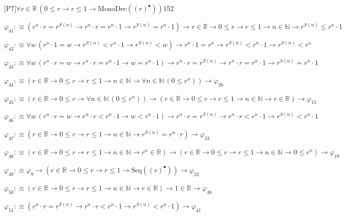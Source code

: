 \begin{fullproof}{[P7]}{$\forall r \in \mathbb{R}\,(0 \leq r \to r \leq 1 \to \mathrm{MonoDec}({(r)^{\bullet}}))$}{152}
\begin{abbrevlist}
\item $\varphi_{41} :\equiv ({{r}^{n}} \cdot r = {{r}^{S(n)}} \to {{r}^{n}} \cdot r = {{r}^{n}} \cdot 1 \to {{r}^{S(n)}} = {{r}^{n}} \cdot 1) \to r \in \mathbb{R} \to 0 \leq r \to r \leq 1 \to n \in \mathbb{N} \to {{r}^{S(n)}} \leq {{r}^{n}} \cdot 1$
\item $\varphi_{42} :\equiv \forall w\,({{r}^{n}} \cdot 1 = w \to {{r}^{S(n)}} < {{r}^{n}} \cdot 1 \to {{r}^{S(n)}} < w) \to {{r}^{n}} \cdot 1 = {{r}^{n}} \to {{r}^{S(n)}} < {{r}^{n}} \cdot 1 \to {{r}^{S(n)}} < {{r}^{n}}$
\item $\varphi_{43} :\equiv \forall w\,({{r}^{n}} \cdot r = w \to {{r}^{n}} \cdot r = {{r}^{n}} \cdot 1 \to w = {{r}^{n}} \cdot 1) \to {{r}^{n}} \cdot r = {{r}^{S(n)}} \to {{r}^{n}} \cdot r = {{r}^{n}} \cdot 1 \to {{r}^{S(n)}} = {{r}^{n}} \cdot 1$
\item $\varphi_{44} :\equiv (r \in \mathbb{R} \to 0 \leq r \to r \leq 1 \to n \in \mathbb{N} \to \forall n \in \mathbb{N}\,(0 \leq {{r}^{n}})) \to \varphi_{26}$
\item $\varphi_{45} :\equiv (r \in \mathbb{R} \to 0 \leq r \to \forall n \in \mathbb{N}\,(0 \leq {{r}^{n}})) \to (r \in \mathbb{R} \to 0 \leq r \to r \leq 1 \to n \in \mathbb{N} \to r \in \mathbb{R}) \to \varphi_{15}$
\item $\varphi_{46} :\equiv \forall w\,({{r}^{n}} \cdot r = w \to {{r}^{n}} \cdot r < {{r}^{n}} \cdot 1 \to w < {{r}^{n}} \cdot 1) \to {{r}^{n}} \cdot r = {{r}^{S(n)}} \to {{r}^{n}} \cdot r < {{r}^{n}} \cdot 1 \to {{r}^{S(n)}} < {{r}^{n}} \cdot 1$
\item $\varphi_{47} :\equiv (r \in \mathbb{R} \to 0 \leq r \to r \leq 1 \to n \in \mathbb{N} \to {{r}^{S(n)}} = {{r}^{n}} \cdot r) \to \varphi_{33}$
\item $\varphi_{48} :\equiv (r \in \mathbb{R} \to 0 \leq r \to r \leq 1 \to n \in \mathbb{N} \to {{r}^{n}} \in \mathbb{R}) \to (r \in \mathbb{R} \to 0 \leq r \to r \leq 1 \to n \in \mathbb{N} \to 0 \leq {{r}^{n}}) \to \varphi_{19}$
\item $\varphi_{49} :\equiv \varphi_{9} \to (r \in \mathbb{R} \to 0 \leq r \to r \leq 1 \to \mathrm{Seq}({(r)^{\bullet}})) \to \varphi_{22}$
\item $\varphi_{50} :\equiv (r \in \mathbb{R} \to 0 \leq r \to r \leq 1 \to n \in \mathbb{N} \to r \in \mathbb{R}) \to 1 \in \mathbb{R} \to \varphi_{48}$
\item $\varphi_{51} :\equiv ({{r}^{n}} \cdot r = {{r}^{S(n)}} \to {{r}^{n}} \cdot r < {{r}^{n}} \cdot 1 \to {{r}^{S(n)}} < {{r}^{n}} \cdot 1) \to \varphi_{41}$

\end{abbrevlist}
\end{fullproof}
